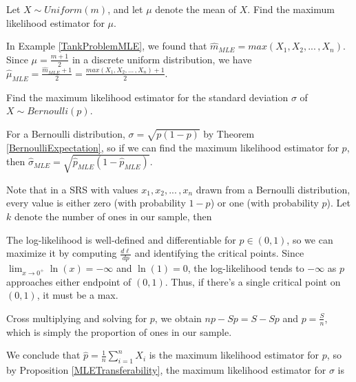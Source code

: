 \begin{examp}Let $X \sim Uniform(m)$, and let $\mu$ denote the mean of $X$. Find the maximum likelihood estimator for $\mu$.
\par
\noindent In Example \ref{TankProblemMLE}, we found that $\widehat{m}_{MLE} = max(X_1,X_2, ... \,,X_n)$. Since $\mu = \frac{m+1}{2}$ in a discrete uniform distribution, we have $\widehat{\mu}_{MLE} = \frac{\widehat{m}_{MLE}+1}{2} = \frac{max(X_1,X_2, ... \,,X_n)+1}{2}$.
\end{examp}

\begin{examp}Find the maximum likelihood estimator for the standard deviation $\sigma$ of $X \sim Bernoulli(p)$.
\par
\noindent For a Bernoulli distribution, $\sigma = \sqrt{p(1-p)}$ by Theorem \ref{BernoulliExpectation}, so if we can find the maximum likelihood estimator for $p$, then $\widehat{\sigma}_{MLE} = \sqrt{\widehat{p}_{MLE}(1-\widehat{p}_{MLE})}$. 
\par
\noindent Note that in a SRS with values $x_1, x_2, ...\,,x_n$ drawn from a Bernoulli distribution, every value is either zero (with probability $1-p$) or one (with probability $p$). Let $k$ denote the number of ones in our sample, then
\par
\noindent The log-likelihood is well-defined and differentiable for $p \in (0,1)$, so we can maximize it by computing $\frac{d\ell}{dp}$ and identifying the critical points. Since $\lim_{x \to 0^{+}} \ln(x) = -\infty$ and $\ln(1) = 0$, the log-likelihood tends to $-\infty$ as $p$ approaches either endpoint of $(0,1)$. Thus, if there's a single critical point on $(0,1)$, it must be a max.
\par
\noindent Cross multiplying and solving for $p$, we obtain $np - Sp = S-Sp$ and $p = \frac{S}{n}$, which is simply the proportion of ones in our sample.
\par
\noindent We conclude that $\widehat{p} = \frac{1}{n}\sum_{i=1}^{n}X_i$ is the maximum likelihood estimator for $p$, so by Proposition \ref{MLETransferability}, the maximum likelihood estimator for $\sigma$ is
\end{examp}
